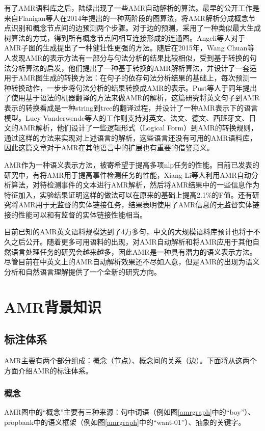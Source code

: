 \documentclass[master, winfont]{njuthesis}
\begin{document}
有了AMR语料库之后，陆续出现了一些AMR自动解析的算法。最早的公开工作是来自Flanigan等人\cite{Flanigan2014}在2014年提出的一种两阶段的图算法，将AMR解析分成概念节点识别和概念节点间的边预测两个步骤。对于边的预测，采用了一种类似最大生成树算法的方式，得到所有概念节点间相互连接形成的连通图。Angeli等人\cite{Angeli2014}对于AMR子图的生成提出了一种健壮性更强的方法。随后在2015年，Wang Chuan\cite{Wang2015}等人发现AMR的表示方法有一部分与句法分析的结果比较相似，受到基于转换的句法分析算法的启发，他们提出了一种基于转换的AMR解析算法，并设计了一套适用于AMR图生成的转换方法：在句子的依存句法分析结果的基础上，每次预测一种转换动作，一步步将句法分析的结果转换成AMR的表示。Pust等人\cite{Pust2015}于同年提出了使用基于语法的机器翻译的方法来做AMR的解析，这篇研究将英文句子到AMR表示的转换看成是一种string到tree的翻译过程，并设计了一种AMR表示下的语言模型。Lucy Vanderwende等人\cite{Vanderwende2015}的工作则支持对英文、法文、德文、西班牙文、日文的AMR解析，他们设计了一些逻辑形式（Logical Form）到AMR的转换规则，通过这样的方法来实现对上述语言的解析，这些语言还没有可用的AMR语料库，因此这篇文章对于AMR在其他语言中的扩展也有重要的借鉴意义。

AMR作为一种语义表示方法，被寄希望于提高多项nlp任务的性能。目前已发表的研究中，有将AMR用于提高事件检测任务的性能\cite{kai2015improving}，Xiang Li等人利用AMR自动分析算法，对待检测事件的文本进行AMR解析，然后将AMR结果中的一些信息作为特征加入，实验结果证明这样的做法可以在原来的基础上提高2.1\%的F值。还有研究将AMR用于无监督的实体链接任务\cite{Pan2015}，结果表明使用了AMR信息的无监督实体链接的性能可以和有监督的实体链接性能相当。

目前已知的AMR英文语料规模达到了4万多句，中文的大规模语料库预计也将于不久之后公开。随着更多可用语料的出现，对AMR自动解析和将AMR应用于其他自然语言处理任务的研究会越来越多，因此AMR是一种具有潜力的语义表示方法。尽管目前在中英文上的AMR自动解析效果还不尽如人意，但是AMR的出现为语义分析和自然语言理解提供了一个全新的研究方向。

\section{AMR背景知识}
\subsection{标注体系}
AMR主要有两个部分组成：概念（节点）、概念间的关系（边）。下面将从这两个方面介绍AMR的标注体系。

\subsubsection{概念}
AMR图中的“概念”主要有三种来源：句中词语（例如图\ref{amrgraph}中的“boy”）、propbank中的语义框架（例如图\ref{amrgraph}中的“want-01”）、抽象的关键字。
\end{document}
